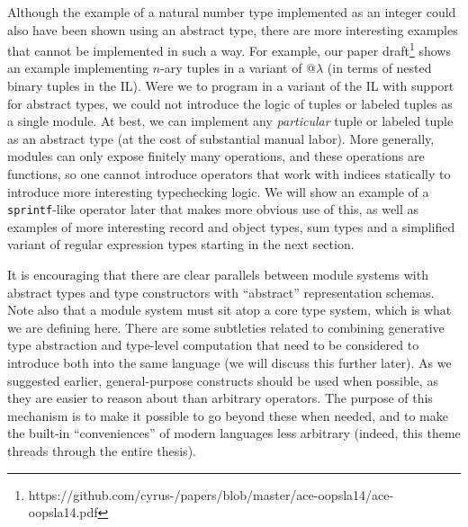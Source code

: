 Although the example of a natural number type implemented as an integer could also have been shown using an abstract type, there are more interesting examples that cannot be implemented in such a way. For example, our paper draft\footnote{https://github.com/cyrus-/papers/blob/master/ace-oopsla14/ace-oopsla14.pdf} shows an example implementing $n$-ary tuples in a variant of @$\lambda$ (in terms of nested binary tuples in the IL). Were we to program in a variant of the IL with support for abstract types, we could not introduce the logic of tuples or labeled tuples as a single module. At best, we can implement any \emph{particular} tuple or labeled tuple as an abstract type (at the cost of substantial manual labor). More generally, modules can only expose finitely many operations, and these operations are functions, so one cannot introduce operators that work with indices statically to introduce more interesting typechecking logic. We will show an example of a \verb|sprintf|-like operator later that makes more obvious use of this, as well as examples of more interesting record and object types, sum types and a simplified variant of regular expression types starting in the next section.

It is encouraging that there are clear parallels between module systems with abstract types and type constructors with ``abstract'' representation schemas. Note also that a module system must sit atop a core type system, which is what we are defining here. There are some subtleties related to combining generative type abstraction and type-level computation that need to be considered to introduce both into the same language \cite{conf/popl/WeirichVJZ11} (we will discuss this further later). As we suggested earlier, general-purpose constructs should be used when possible, as they are easier to reason about than arbitrary operators. The purpose of this mechanism is to make it possible to go beyond these when needed, and to make the built-in ``conveniences'' of modern languages less arbitrary (indeed, this  theme threads through the entire thesis).

